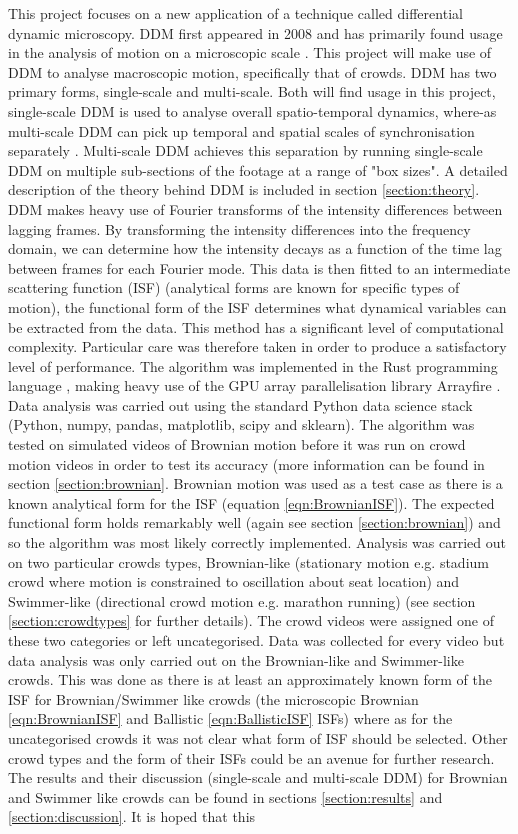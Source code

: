 \documentclass[11pt]{article}
\begin{document}
This project focuses on a new application of a technique called differential dynamic microscopy. DDM first appeared in 2008 \cite{ddm0} and has primarily found usage in the analysis of motion on a microscopic scale \cite{ddm1}. This project will make use of DDM to analyse macroscopic motion, specifically that of crowds. DDM has two primary forms, single-scale and multi-scale. Both will find usage in this project, single-scale DDM is used to analyse overall spatio-temporal dynamics, where-as multi-scale DDM can pick up temporal and spatial scales of synchronisation separately \cite{ddm1}. Multi-scale DDM achieves this separation by running single-scale DDM on multiple sub-sections of the footage at a range of "box sizes". A detailed description of the theory behind DDM is included in section \ref{section:theory}. DDM makes heavy use of Fourier transforms of the intensity differences between lagging frames. By transforming the intensity differences into the frequency domain, we can determine how the intensity decays as a function of the time lag between frames for each Fourier mode.  This data is then fitted to an intermediate scattering function (ISF) (analytical forms are known for specific types of motion), the functional form of the ISF determines what dynamical variables can be extracted from the data. This method has a significant level of computational complexity. Particular care was therefore taken in order to produce a satisfactory level of performance. The algorithm was implemented in the Rust programming language \cite{rust}, making heavy use of the GPU array parallelisation library Arrayfire \cite{arrayfire}. Data analysis was carried out using the standard Python data science stack (Python, numpy, pandas, matplotlib, scipy and sklearn). The algorithm was tested on simulated videos of Brownian motion before it was run on crowd motion videos in order to test its accuracy (more information can be found in section \ref{section:brownian}. Brownian motion was used as a test case as there is a known analytical form for the ISF (equation \ref{eqn:BrownianISF}). The expected functional form holds remarkably well (again see section \ref{section:brownian}) and so the algorithm was most likely correctly implemented. Analysis was carried out on two particular crowds types, Brownian-like (stationary motion e.g. stadium crowd where motion is constrained to oscillation about seat location) and Swimmer-like (directional crowd motion e.g. marathon running) (see section \ref{section:crowdtypes} for further details). The crowd videos were assigned one of these two categories or left uncategorised. Data was collected for every video but data analysis was only carried out on the Brownian-like and Swimmer-like crowds. This was done as there is at least an approximately known form of the ISF for Brownian/Swimmer like crowds (the microscopic Brownian \ref{eqn:BrownianISF} and Ballistic \ref{eqn:BallisticISF} ISFs) where as for the uncategorised crowds it was not clear what form of ISF should be selected. Other crowd types and the form of their ISFs could be an avenue for further research. The results and their discussion (single-scale and multi-scale DDM) for Brownian and Swimmer like crowds can be found in sections \ref{section:results} and \ref{section:discussion}. It is hoped that this 
\end{document}
